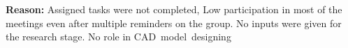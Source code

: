 \documentclass[table]{rapportCS}
\begin{document}
\textbf{Reason:} Assigned tasks were not completed, Low participation in most of the meetings even after multiple reminders on the group. No inputs were given for the research stage. No role in CAD model designing
\newpage
\renewcommand{\contentsname}{Table of contents}\label{sec:toc}
\toc
\end{document}
